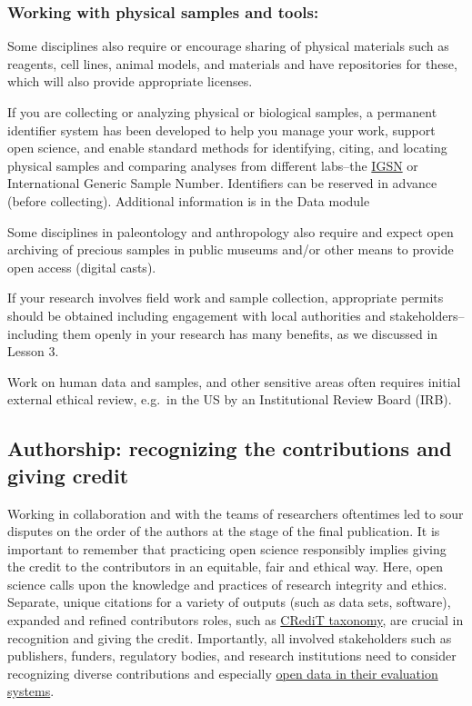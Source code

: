 \documentclass[
  letterpaper,
  DIV=11,
  numbers=noendperiod]{scrreport}
\begin{document}
\hypertarget{working-with-physical-samples-and-tools}{%
\subsubsection{Working with physical samples and
tools:}\label{working-with-physical-samples-and-tools}}

Some disciplines also require or encourage sharing of physical materials
such as reagents, cell lines, animal models, and materials and have
repositories for these, which will also provide appropriate licenses.

If you are collecting or analyzing physical or biological samples, a
permanent identifier system has been developed to help you manage your
work, support open science, and enable standard methods for identifying,
citing, and locating physical samples and comparing analyses from
different labs--the \href{https://www.igsn.org/}{IGSN} or International
Generic Sample Number. Identifiers can be reserved in advance (before
collecting). Additional information is in the Data module

Some disciplines in paleontology and anthropology also require and
expect open archiving of precious samples in public museums and/or other
means to provide open access (digital casts).

If your research involves field work and sample collection, appropriate
permits should be obtained including engagement with local authorities
and stakeholders--including them openly in your research has many
benefits, as we discussed in Lesson 3.

Work on human data and samples, and other sensitive areas often requires
initial external ethical review, e.g.~in the US by an Institutional
Review Board (IRB).

\hypertarget{authorship-recognizing-the-contributions-and-giving-credit}{%
\subsection{Authorship: recognizing the contributions and giving
credit}\label{authorship-recognizing-the-contributions-and-giving-credit}}

Working in collaboration and with the teams of researchers oftentimes
led to sour disputes on the order of the authors at the stage of the
final publication. It is important to remember that practicing open
science responsibly implies giving the credit to the contributors in an
equitable, fair and ethical way. Here, open science calls upon the
knowledge and practices of research integrity and ethics. Separate,
unique citations for a variety of outputs (such as data sets, software),
expanded and refined contributors roles, such as
\href{https://credit.niso.org/}{CRediT taxonomy}, are crucial in
recognition and giving the credit. Importantly, all involved
stakeholders such as publishers, funders, regulatory bodies, and
research institutions need to consider recognizing diverse contributions
and especially \href{https://doi.org/10.1038/d41586-022-00921-x}{open
data in their evaluation systems}.
\end{document}
